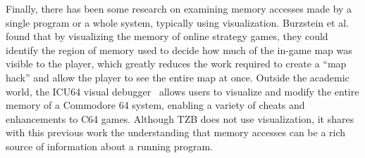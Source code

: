 Finally, there has been some research on examining memory accesses made
by a single program or a whole system, typically using visualization.
Burzstein et al.~\cite{Bursztein:2011fk} found that by visualizing
the memory of online strategy games, they could identify the region of
memory used to decide how much of the in-game map was visible to the
player, which greatly reduces the work required to create a ``map hack''
and allow the player to see the entire map at once. Outside the academic
world, the ICU64 visual debugger~\cite{icu64} allows users to visualize
and modify the entire memory of a Commodore 64 system, enabling a
variety of cheats and enhancements to C64 games. Although TZB does not
use visualization, it shares with this previous work the understanding
that memory accesses can be a rich source of information about a running
program.

